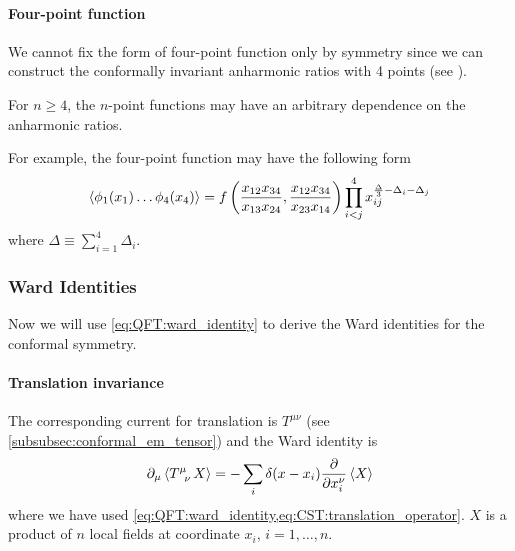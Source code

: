 \documentclass[10pt]{article}
\begin{document}
\paragraph{Four-point function}
We cannot fix the form of four-point function only by symmetry since we can construct the conformally invariant anharmonic ratios with 4 points (see ).

\begin{remark}
    For $n\geq4$, the $n$-point functions may have an arbitrary dependence on the anharmonic ratios.
\end{remark}
For example, the four-point function may have the following form
\begin{align}
    \expval{\phi_1(x_1)\dots\phi_4(x_4)}=f\left(\frac{x_{12}x_{34}}{x_{13}x_{24}},\frac{x_{12}x_{34}}{x_{23}x_{14}}\right)\prod_{i<j}^4 x_{ij}^{\frac{\Delta}{3}-\Delta_i-\Delta_j}\label{eq:CIQFT:4_points}
\end{align}
where $\Delta\equiv\sum_{i=1}^4\Delta_i$.


\subsubsection{Ward Identities}
Now we will use \cref{eq:QFT:ward_identity} to derive the Ward identities for the conformal symmetry.

\paragraph{Translation invariance}
The corresponding current for translation is $T^{\mu\nu}$ (see \cref{subsubsec:conformal_em_tensor}) and the Ward identity is
\begin{align}
    \partial_\mu\expval{\tensor{T}{^\mu_\nu}X}=-\sum_i\delta(x-x_i)\pdv{x^\nu_i}\expval{X}\label{eq:GCI:conformal_ward_1}
\end{align}
where we have used \cref{eq:QFT:ward_identity,eq:CST:translation_operator}.
$X$ is a product of $n$ local fields at coordinate $x_i$, $i=1,\dots,n$.
\end{document}
